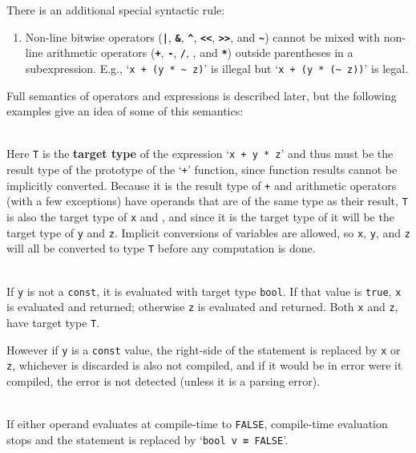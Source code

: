 \documentclass[12pt]{article}
\newcommand{\TT}[1]{{\tt \bfseries #1}}
\newcommand{\key}[1]{{\rm \bfseries #1}}
\newenvironment{indpar}[1][0.3in]%
	{\begin{list}{}%
		     {\setlength{\itemsep}{0in}%
		      \setlength{\topsep}{0in}%
		      \setlength{\parsep}{1ex}%
		      \setlength{\labelwidth}{#1}%
		      \setlength{\leftmargin}{#1}%
		      \addtolength{\leftmargin}{\labelsep}}%
	 \item}%
	{\end{list}}
\begin{document}
There is an additional special syntactic rule:
\begin{enumerate}
\item Non-line bitwise operators (\TT{|}, \TT{\&}, \TT{\textasciicircum},
\TT{<{}<}, \TT{>{}>}, and \TT{\textasciitilde}) cannot be mixed
with non-line arithmetic operators
(\TT{+}, \TT{-}, \TT{/}, \TT{*}, and \TT{**})
outside parentheses in a subexpression.
E.g., `{\tt x + (y * \textasciitilde{} z)}'
is illegal but `{\tt x + (y * (\textasciitilde{} z))}' is legal.
\end{enumerate}


Full semantics of operators and expressions is described later,
but the following examples give an idea of some of this semantics:

\begin{indpar}
\hspace*{-0.2in}{\tt T v \TT{=} x + y * z} \\
       Here {\tt T} is the \key{target type} of the expression
       `{\tt x + y * z}' and thus must be the result type of the prototype
       of the `{\tt +}' function, since function results cannot be
       implicitly converted.  Because it is the result type of {\tt +} and
       arithmetic operators (with a few exceptions)
       have operands that are of the same
       type as their result,
       {\tt T} is also the target type of {\tt x} and {\tt *}, and since it is
       the target type of {\tt *} it will be the target type of {\tt y}
       and {\tt z}.  Implicit conversions of variables are allowed,
       so {\tt x}, {\tt y}, and {\tt z} will all be converted
       to type {\tt T} before any computation is done.

\hspace*{-0.2in}{\tt T v \TT{=} x \TT{if} y \TT{else} z} \\
      If {\tt y} is not a {\tt const}, it is evaluated with
      target type {\tt bool}.  If that value
      is {\tt true}, {\tt x} is evaluated and returned; otherwise
      {\tt z} is evaluated and returned.  Both {\tt x} and {\tt z},
      have target type {\tt T}.

      However if {\tt y} is a {\tt const} value, the right-side of
      the statement is replaced by {\tt x} or {\tt z}, whichever
      is discarded is also not compiled, and if it would be in error
      were it compiled, the error is not detected (unless it is a parsing
      error).

\hspace*{-0.2in}{\tt bool v = x \TT{AND} y} \\
      If either operand evaluates at compile-time to {\tt FALSE},
      compile-time evaluation stops and the statement is replaced by
      `{\tt bool v \TT{=} FALSE}'.


\end{indpar}
\end{document}
